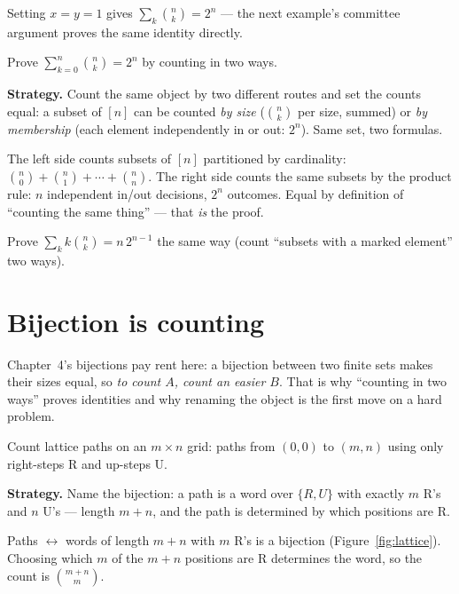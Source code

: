 Setting $x = y = 1$ gives $\sum_k \binom{n}{k} = 2^n$ --- the next
example's committee argument proves the same identity directly.

\begin{example}\label{ex:committee}
Prove $\sum_{k=0}^{n} \binom{n}{k} = 2^n$ by counting in two ways.
\par\smallskip
\textbf{Strategy.} Count the same object by two different routes and set
the counts equal: a subset of $[n]$ can be counted \emph{by size}
($\binom{n}{k}$ per size, summed) or \emph{by membership} (each element
independently in or out: $2^n$). Same set, two formulas.
\par\smallskip
\begin{solution}
The left side counts subsets of $[n]$ partitioned by cardinality:
$\binom{n}{0} + \binom{n}{1} + \cdots + \binom{n}{n}$. The right side
counts the same subsets by the product rule: $n$ independent
in/out decisions, $2^n$ outcomes. Equal by definition of ``counting the
same thing'' --- that \emph{is} the proof.
\end{solution}
\end{example}

\begin{exercise}[medium]\label{exr:committee}
Prove $\sum_{k} k\binom{n}{k} = n\,2^{n-1}$ the same way (count
``subsets with a marked element'' two ways).
\end{exercise}

\section{Bijection is counting}\label{sec:biject}

Chapter~4's bijections pay rent here: a bijection between two finite sets
makes their sizes equal, so \emph{to count $A$, count an easier $B$}.
That is why ``counting in two ways'' proves identities and why renaming
the object is the first move on a hard problem.

\begin{example}\label{ex:lattice}
Count lattice paths on an $m \times n$ grid: paths from $(0,0)$ to
$(m,n)$ using only right-steps R and up-steps U.
\par\smallskip
\textbf{Strategy.} Name the bijection: a path is a word over
$\{R, U\}$ with exactly $m$ R's and $n$ U's --- length $m+n$, and the
path is determined by which positions are R.
\par\smallskip
\begin{solution}
Paths $\leftrightarrow$ words of length $m+n$ with $m$ R's is a
bijection (Figure~\ref{fig:lattice}). Choosing which $m$ of the $m+n$
positions are R determines the word, so the count is $\binom{m+n}{m}$.
\end{solution}
\end{example}

